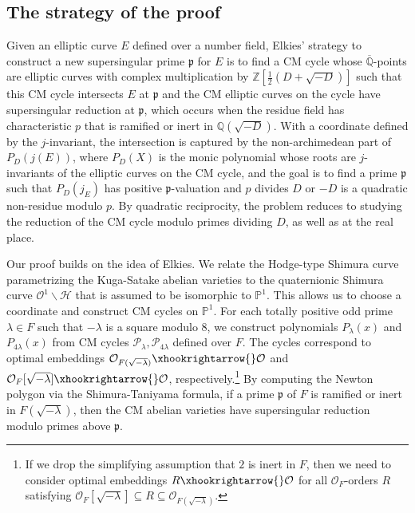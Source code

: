 \documentclass{amsart}
\numberwithin{equation}{subsection}
\numberwithin{theorem}{section}
\theoremstyle{definition}
\theoremstyle{remark}
\newcommand{\bQ}{\mathbb{Q}}
\newcommand{\cH}{\mathcal{H}}
\newcommand{\cO}{\mathcal{O}}
\newcommand{\fp}{\mathfrak{p}}
\begin{document}
\subsection{The strategy of the proof}\label{sec:strategy}

Given an elliptic curve $E$ defined over a number field, Elkies' strategy to construct a new supersingular prime $\fp$ for $E$ is to find a CM cycle whose $\overline{\bQ}$-points are elliptic curves with complex multiplication by $\mathbb{Z}[\frac{1}{2}(D+\sqrt{-D})]$ such that this CM cycle intersects $E$ at $\fp$ and the CM elliptic curves on the cycle have supersingular reduction at $\fp$, which occurs when the residue field has characteristic $p$ that is ramified or inert in $\bQ(\sqrt{-D})$. 
With a coordinate defined by the $j$-invariant, the intersection is captured by the non-archimedean part of  $P_D(j(E))$, where $P_D(X)$ is the monic polynomial whose roots are $j$-invariants of the elliptic curves on the CM cycle, and the goal is to find a prime $\fp$ such that $P_D(j_E)$ has positive $\fp$-valuation and $p$ divides $D$ or $-D$ is a quadratic non-residue modulo $p$. By quadratic reciprocity, the problem reduces to studying the reduction of the CM cycle modulo primes dividing $D$, as well as at the real place. 

Our proof builds on the idea of Elkies. We relate the Hodge-type Shimura curve parametrizing the Kuga-Satake abelian varieties to the quaternionic Shimura curve $\cO^1 \backslash \cH$ that is assumed to be isomorphic to $\mathbb{P}^1$. This allows us to choose a coordinate and construct CM cycles on $\mathbb{P}^1$. For each totally positive odd prime $\lambda\in F$ such that $-\lambda$ is a square modulo $8$, we construct polynomials $P_{\lambda}(x)$ and $P_{4\lambda}(x)$ from CM cycles $\mathcal{P}_{\lambda}, \mathcal{P}_{4\lambda}$ defined over $F$. The cycles correspond to optimal embeddings $\cO_{F(\sqrt{-\lambda})} \xhookrightarrow{} \cO$ and $\cO_{F}[\sqrt{-\lambda}]\xhookrightarrow{} \cO$, respectively.\footnote{If we drop the simplifying assumption that $2$ is inert in $F$, then we need to consider optimal embeddings $R\xhookrightarrow{} \cO$ for all $\cO_F$-orders $R$ satisfying $\cO_{F}[\sqrt{-\lambda}]\subseteq R\subseteq \cO_{F(\sqrt{-\lambda})}$.}
By computing the Newton polygon via the Shimura-Taniyama formula, if a prime $\fp$ of $F$ is ramified or inert in $F(\sqrt{-\lambda})$, then the CM abelian varieties have supersingular reduction modulo primes above $\fp$. 
\end{document}

